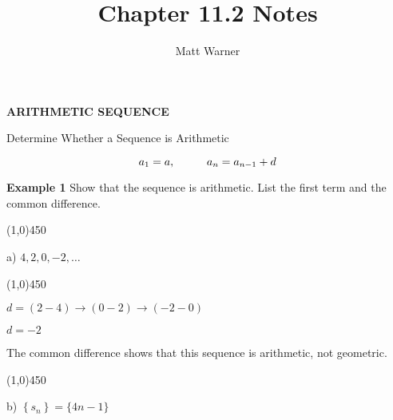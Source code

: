 \documentclass{report}
\title{\Huge{Chapter 11.2 Notes}}
\author{\huge{Matt Warner}}
\date{\huge{}}
\begin{document}
	\maketitle
\begin{LARGE}
	\begin{center}
		\textbf{ARITHMETIC SEQUENCE} 
	\end{center}
\end{LARGE}
\bigbreak \noindent \bigbreak \noindent
\begin{large}
 Determine Whether a Sequence is Arithmetic 
 \vspace{5mm}

 $$a_1 = a, \hspace{10mm} a_n = a_{n-1} +d$$
\end{large}
\bigbreak \noindent

\bigbreak \noindent \bigbreak \noindent \bigbreak \noindent 

\begin{large}
	  \noindent \textbf{Example 1} 
	 Show that the sequence is arithmetic. List the first term and the common difference.
\end{large}
\bigbreak \noindent

\line(1,0){450}

\begin{center}
\begin{large}
	{\LARGE{a)}} $ 4, 2,0, -2,\ldots$
\end{large}
\end{center}

\line(1,0){450}
\bigbreak \noindent

\begin{center}
 $d = (2-4) \rightarrow (0-2) \rightarrow (-2-0)$
 \vspace{2mm}

 $d = -2$
 \vspace{4mm}

 The common difference shows that this sequence is arithmetic, not geometric.
\end{center}
\bigbreak \noindent \bigbreak \noindent

\line(1,0){450}

\begin{center}
\begin{large}
	{\LARGE{b)}} $\left\{s_n\right\}=\{4 n-1\}$
\end{large}
\end{center}
\end{document}

